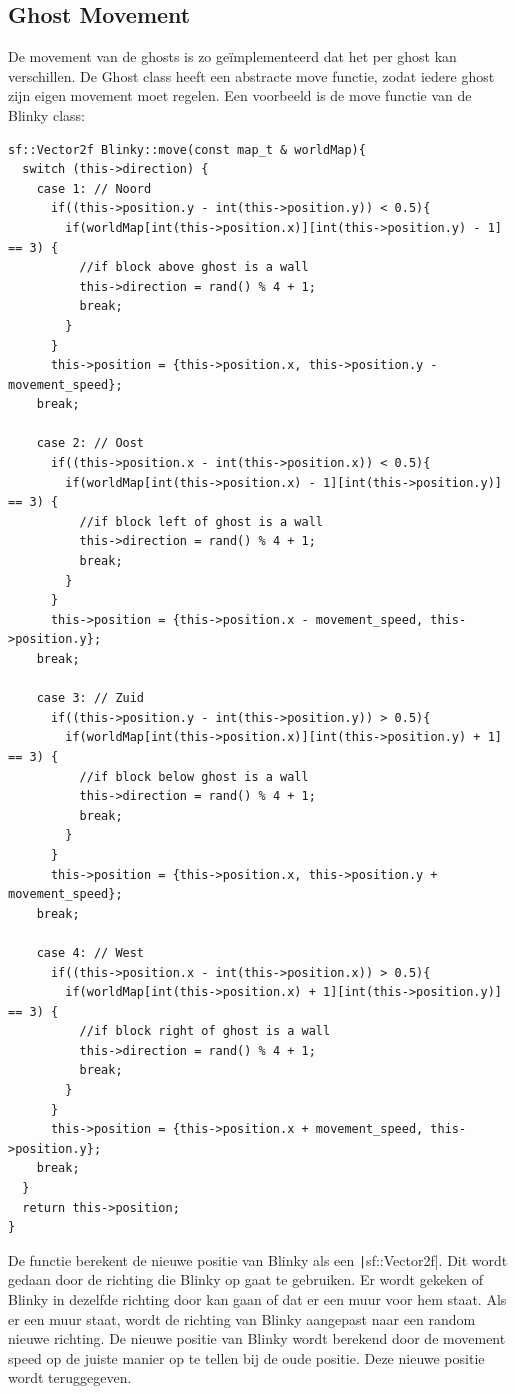 \documentclass{report}
\begin{document}
    \subsection{Ghost Movement} %
    \label{sub:ghost_movement}
    De movement van de ghosts is zo geïmplementeerd dat het per ghost kan verschillen. De Ghost class heeft een abstracte move functie, zodat iedere ghost zijn eigen movement moet regelen. Een voorbeeld is de move functie van de Blinky class:
    \begin{verbatim}
sf::Vector2f Blinky::move(const map_t & worldMap){
  switch (this->direction) {
    case 1: // Noord
      if((this->position.y - int(this->position.y)) < 0.5){
        if(worldMap[int(this->position.x)][int(this->position.y) - 1] == 3) {
          //if block above ghost is a wall
          this->direction = rand() % 4 + 1;
          break;
        }
      }
      this->position = {this->position.x, this->position.y - movement_speed};
    break;

    case 2: // Oost
      if((this->position.x - int(this->position.x)) < 0.5){
        if(worldMap[int(this->position.x) - 1][int(this->position.y)] == 3) {
          //if block left of ghost is a wall
          this->direction = rand() % 4 + 1;
          break;
        }
      }
      this->position = {this->position.x - movement_speed, this->position.y};
    break;

    case 3: // Zuid
      if((this->position.y - int(this->position.y)) > 0.5){
        if(worldMap[int(this->position.x)][int(this->position.y) + 1] == 3) {
          //if block below ghost is a wall
          this->direction = rand() % 4 + 1;
          break;
        }
      }
      this->position = {this->position.x, this->position.y + movement_speed};
    break;

    case 4: // West
      if((this->position.x - int(this->position.x)) > 0.5){
        if(worldMap[int(this->position.x) + 1][int(this->position.y)] == 3) {
          //if block right of ghost is a wall
          this->direction = rand() % 4 + 1;
          break;
        }
      }
      this->position = {this->position.x + movement_speed, this->position.y};
    break;
  }
  return this->position;
}
    \end{verbatim}
    De functie berekent de nieuwe positie van Blinky als een \texttt|sf::Vector2f|. Dit wordt gedaan door de richting die Blinky op gaat te gebruiken. Er wordt gekeken of Blinky in dezelfde richting door kan gaan of dat er een muur voor hem staat. Als er een muur staat, wordt de richting van Blinky aangepast naar een random nieuwe richting. De nieuwe positie van Blinky wordt berekend door de movement speed op de juiste manier op te tellen bij de oude positie. Deze nieuwe positie wordt teruggegeven.
\end{document}
